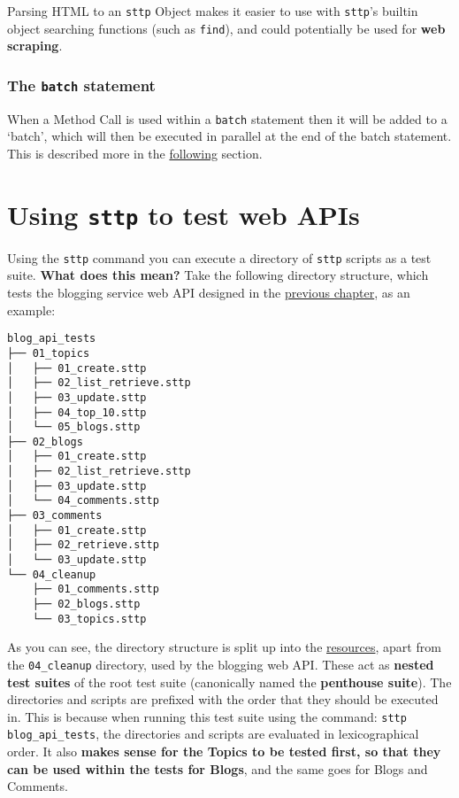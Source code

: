 Parsing HTML to an \verb|sttp| Object makes it easier to use with \verb|sttp|'s builtin object searching functions (such as \verb|find|), and could potentially be used for \textbf{web scraping}.

\cprotect\subsubsection{The \verb|batch| statement}

When a Method Call is used within a \verb|batch| statement then it will be added to a `batch', which will then be executed in parallel at the end of the batch statement. This is described more in the \hyperref[sec:batching]{following} section.

\cprotect\section{Using \verb|sttp| to test web APIs}
\label{sec:hello-sttp-using-sttp-to-test}

Using the \verb|sttp| command you can execute a directory of \verb|sttp| scripts as a test suite. \textbf{What does this mean?} Take the following directory structure, which tests the blogging service web API designed in the \hyperref[chap:designing-rest-api]{previous chapter}, as an example:

\begin{verbatim}
blog_api_tests
├── 01_topics
│   ├── 01_create.sttp
│   ├── 02_list_retrieve.sttp
│   ├── 03_update.sttp
│   ├── 04_top_10.sttp
│   └── 05_blogs.sttp
├── 02_blogs
│   ├── 01_create.sttp
│   ├── 02_list_retrieve.sttp
│   ├── 03_update.sttp
│   └── 04_comments.sttp
├── 03_comments
│   ├── 01_create.sttp
│   ├── 02_retrieve.sttp
│   └── 03_update.sttp
└── 04_cleanup
    ├── 01_comments.sttp
    ├── 02_blogs.sttp
    └── 03_topics.sttp
\end{verbatim}

As you can see, the directory structure is split up into the \hyperref[sec:designing-rest-api-blogging-service]{resources}, apart from the \verb|04_cleanup| directory, used by the blogging web API. These act as \textbf{nested test suites} of the root test suite (canonically named the \textbf{penthouse suite}). The directories and scripts are prefixed with the order that they should be executed in. This is because when running this test suite using the command: \verb|sttp blog_api_tests|, the directories and scripts are evaluated in lexicographical order. It also \textbf{makes sense for the Topics to be tested first, so that they can be used within the tests for Blogs}, and the same goes for Blogs and Comments.

